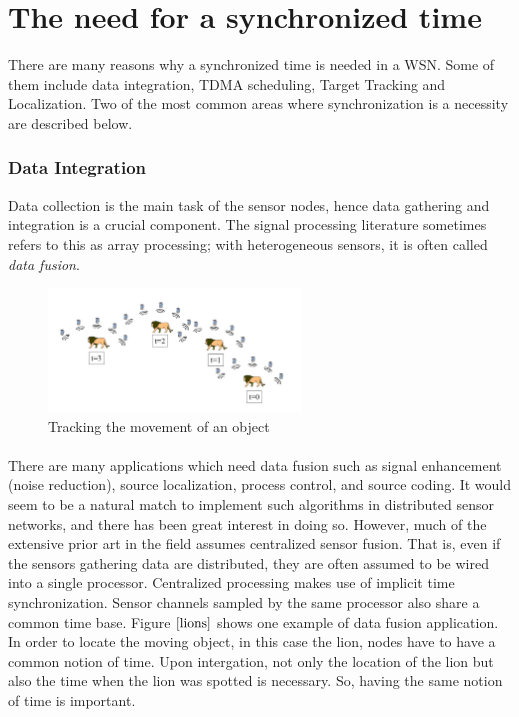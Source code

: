 \documentclass[a4paper,10pt]{report}
\begin{document}
\section{\textbf{The need for a synchronized time}}
There are many reasons why a synchronized time is needed in a WSN. Some of them include data integration, TDMA scheduling, Target
Tracking and Localization. Two of the most common areas where synchronization is a necessity are described below.
\subsubsection{Data Integration}
Data collection is the main task of the sensor nodes, hence data gathering and integration is a crucial component. The signal processing literature sometimes refers to this as array processing; with heterogeneous sensors, it is often called \textit{data fusion}.
\begin{figure}
\centering
\includegraphics[width= 0.6\textwidth]{lions}
\caption{Tracking the movement of an object}
\label{lions}
\end{figure}
\paragraph*{}
There are many applications which need data fusion such as signal enhancement (noise reduction), source localization, process control, and source coding. It would seem to be a natural match to implement such algorithms in distributed sensor networks, and there has been great interest in doing so. However, much of the extensive prior art in the field assumes centralized sensor fusion. That is, even if the sensors
gathering data are distributed, they are often assumed to be wired into a single processor. Centralized processing makes use of
implicit time synchronization. Sensor channels sampled by the same processor also share a common time base. Figure $\ref{lions}$ shows
one example of data fusion application. In order to locate the moving object, in this case the lion, nodes have to have a common
notion of time. Upon intergation, not only the location of the lion but also the time when the lion was spotted is necessary. So, having the same notion of time is important.
\end{document}
